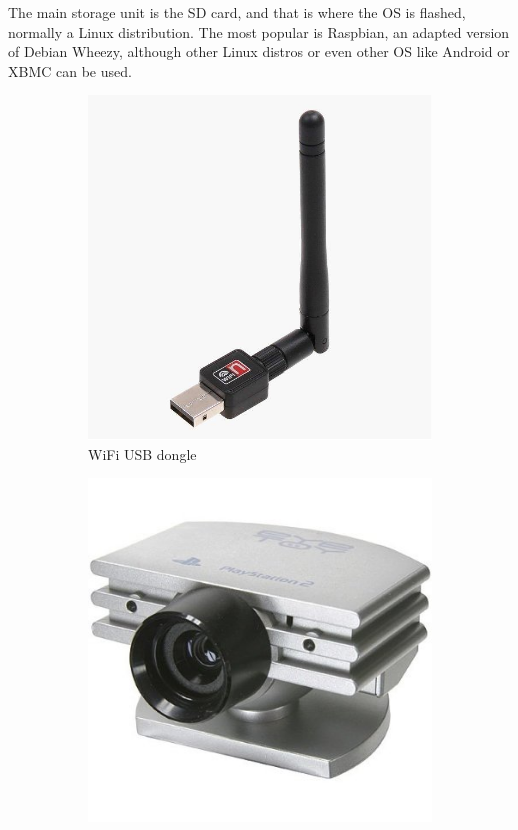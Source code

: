 	The main storage unit is the SD card, and that is where the OS is flashed, normally a Linux distribution. The most popular is Raspbian, an adapted version of Debian Wheezy, although other Linux distros or even other OS like Android or XBMC can be used.

		\begin{figure}[H]
		    \centering
		    \begin{subfigure}[b]{0.3\textwidth}
		        \centering
		        \includegraphics[scale=0.25]{images/ProjectComponents/wifi.jpg}
				\caption{WiFi USB dongle}
		        \label{}
		    \end{subfigure}
		    \hfill
		    \begin{subfigure}[b]{0.3\textwidth}
		        \centering
		        \includegraphics[scale=0.25]{images/ProjectComponents/camera.jpg}

\end{subfigure}
\end{figure}

